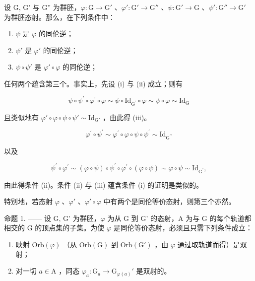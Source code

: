 设 G, G' 与 G'' 为群胚，\(\varphi\colon\mathrm{G}\to\mathrm{G}'\) 、\(\varphi'\colon\mathrm{G}'\to\mathrm{G}''\) 、\(\psi\colon\mathrm{G}'\to\mathrm{G}\) 、\(\psi'\colon\mathrm{G}''\to\mathrm{G}'\) 为群胚态射。那么，在下列条件中：

\begin{enumerate}
\def\labelenumi{(\roman{enumi})}
\item
  \(\psi\) 是 \(\varphi\) 的同伦逆；
\item
  \(\psi'\) 是 \(\varphi'\) 的同伦逆；
\item
  \(\psi \circ \psi'\) 是 \(\varphi' \circ \varphi\) 的同伦逆；
\end{enumerate}

任何两个蕴含第三个。事实上，先设 (i) 与 (ii) 成立；则有

\[
\psi \circ \psi^ {\prime} \circ \varphi^ {\prime} \circ \varphi \sim \psi \circ \mathrm{Id} _ {\mathrm{G} ^ {\prime}} \circ \varphi \sim \psi \circ \varphi \sim \mathrm{Id} _ {\mathrm{G}}
\]

且类似地有 \(\varphi' \circ \varphi \circ \psi \circ \psi' \sim \mathrm{Id}_{\mathrm{G}'}\) ，由此得 (iii)。

\[
\varphi^ {\prime} \circ \psi^ {\prime} \sim \varphi^ {\prime} \circ \varphi \circ \psi \circ \psi^ {\prime} \sim \mathrm{Id} _ {\mathrm{G} ^ {\prime \prime}}
\]

以及

\[
\psi^ {\prime} \circ \varphi^ {\prime} \sim (\varphi \circ \psi) \circ \psi^ {\prime} \circ \varphi^ {\prime} \circ (\varphi \circ \psi) \sim \varphi \circ \psi \sim \mathrm{Id} _ {\mathrm{G} ^ {\prime}},
\]

由此得条件 (ii)。条件 (ii) 与 (iii) 蕴含条件 (i) 的证明是类似的。

特别地，若态射 \(\varphi\) 、\(\varphi'\) 、\(\varphi'\circ\varphi\) 中有两个是同伦等价态射，则第三个亦然。

命题 1. —— 设 G, G' 为群胚，\(\varphi\) 为从 G 到 G' 的态射，A 为与 G 的每个轨道都相交的 G 的顶点集的子集。为使 \(\varphi\) 是同伦等价态射，必须且只需下列条件成立：

\begin{enumerate}
\def\labelenumi{(\roman{enumi})}
\item
  映射 \(\mathrm{Orb}(\varphi)\) （从 \(\mathrm{Orb}(\mathrm{G})\) 到 \(\mathrm{Orb}(\mathrm{G}')\) ，由 \(\varphi\) 通过取轨道而得）是双射；
\item
  对一切 \(a \in \mathrm{A}\) ，同态 \(\varphi_a \colon \mathrm{G}_a \to \mathrm{G}_{\varphi(a)}'\) 是双射的。
\end{enumerate}

